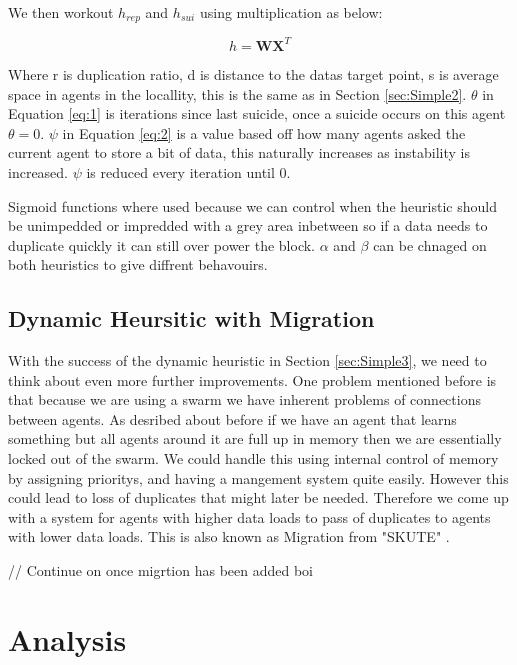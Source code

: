 \documentclass{UoYCSproject}
\begin{document}
We then workout $h_{rep}$ and $h_{sui}$ using multiplication as below:

\begin{equation}
 h  = \textbf{W}  \textbf{X} ^{T} 
\end{equation}

Where r is duplication ratio, d is distance to the datas target point, s is average space in agents in the locallity, this is the same as in Section \ref{sec:Simple2}.
$\theta$ in Equation \ref{eq:1} is iterations since last suicide, once a suicide occurs on this agent $\theta=0$.
$\psi$ in Equation \ref{eq:2} is a value based off how many agents asked the current agent to store a bit of data, this naturally increases as instability is increased.
$\psi$ is reduced every iteration until 0.

Sigmoid functions where used because we can control when the heuristic should be unimpedded or impredded with a grey area inbetween so if a data needs to duplicate quickly it can still over power the block.
$\alpha$ and $\beta$ can be chnaged on both heuristics to give diffrent behavouirs.


\section{Dynamic Heursitic with Migration}
\label{sec:Simple4}

With the success of the dynamic heuristic in Section \ref{sec:Simple3}, we need to think about even more further improvements.
One problem mentioned before is that because we are using a swarm we have inherent problems of connections between agents.
As desribed about before if we have an agent that learns something but all agents around it are full up in memory then we are essentially locked out of the swarm.
We could handle this using internal control of memory by assigning prioritys, and having a mangement system quite easily.
However this could lead to loss of duplicates that might later be needed.
Therefore we come up with a system for agents with higher data loads to pass of duplicates to agents with lower data loads.
This is also known as Migration from "SKUTE" \cite{Distributed Storage}.

// Continue on once migrtion has been added boi



\chapter{Analysis}
\label{cha:Analysis}
\end{document}
